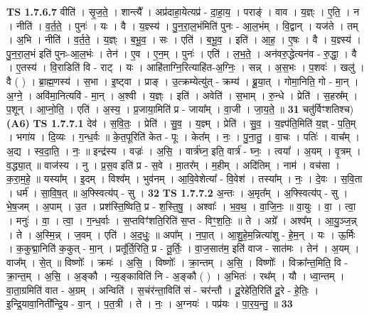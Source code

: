\documentclass[17pt]{extarticle}
\begin{document}
                  \newline
                                \textbf{ TS 1.7.6.7} \newline
                  वीति॑ । सृ॒ज॒ते॒ । शान्त्यै᳚ । अप्र॑दाहा॒येत्यप्र॑ - दा॒हा॒य॒ । पराङ्॑ । वाव । य॒ज्ञ्ः । ए॒ति॒ । न । नीति॑ । व॒र्त॒ते॒ । पुनः॑ । यः । वै । य॒ज्ञ्स्य॑ । पु॒न॒रा॒ल॒भंमिति॑ पुनः - आ॒ल॒भंम् । वि॒द्वान् । यज॑ते । तम् । अ॒भि । नीति॑ । व॒र्त॒ते॒ । य॒ज्ञ्ः । ब॒भू॒व॒ । सः । एति॑ । ब॒भू॒व॒ । इति॑ । आ॒ह॒ । ए॒षः । वै । य॒ज्ञ्स्य॑ । पु॒न॒रा॒ल॒भं इति॑ पुनः-आ॒ल॒भंः । तेन॑ । ए॒व । ए॒न॒म् । पुनः॑ । एति॑ । ल॒भ॒ते॒ । अन॑वरु॒द्धेत्यन॑व - रु॒द्धा॒ । वै । ए॒तस्य॑ । वि॒राडिति॑ वि - राट् । यः । आहि॑ताग्नि॒रित्याहि॑त-अ॒ग्निः॒ । सन्न् । अ॒स॒भः । प॒शवः॑ । खलु॑ । वै ( ) । ब्रा॒ह्म॒णस्य॑ । स॒भा । इ॒ष्ट्वा । प्राङ् । उ॒त्क्रम्येत्यु॑त् - क्रम्य॑ । ब्रू॒या॒त् । गोमा॒निति॒ गो - मा॒न् । अ॒ग्ने॒ । अवि॑मा॒नित्यवि॑ - मा॒न् । अ॒श्वी । य॒ज्ञ्ः । इति॑ । अवेति॑ । स॒भाम् । रु॒न्धे । प्रेति॑ । स॒हस्र᳚म् । प॒शून् । आ॒प्नो॒ति॒ । एति॑ । अ॒स्य॒ । प्र॒जाया॒मिति॑ प्र - जाया᳚म् । वा॒जी । जा॒य॒ते॒ ॥ \textbf{  31} \newline
                  \newline
                      चतु॑र्विꣳशतिश्च)  \textbf{(A6)} \newline \newline
                                \textbf{ TS 1.7.7.1} \newline
                  देव॑ । स॒वि॒तः॒ । प्रेति॑ । सु॒व॒ । य॒ज्ञ्म् । प्रेति॑ । सु॒व॒ । य॒ज्ञ्प॑ति॒मिति॑ य॒ज्ञ् - प॒ति॒म् । भगा॑य । दि॒व्यः । ग॒न्ध॒र्वः ॥ के॒त॒पूरिति॑ केत - पूः । केत᳚म् । नः॒ । पु॒ना॒तु॒ । वा॒चः । पतिः॑ । वाच᳚म् । अ॒द्य । स्व॒दा॒ति॒ । नः॒ ॥ इन्द्र॑स्य । वज्रः॑ । अ॒सि॒ । वार्त्र॑घ्न॒ इति॒ वार्त्र॑ - घ्नः॒ । त्वया᳚ । अ॒यम् । वृ॒त्रम् । व॒द्ध्या॒त् ॥ वाज॑स्य । नु । प्र॒स॒व इति॑ प्र - स॒वे । मा॒तर᳚म् । म॒हीम् । अदि॑तिम् । नाम॑ । वच॑सा । क॒रा॒म॒हे॒ ॥ यस्या᳚म् । इ॒दम् । विश्व᳚म् । भुव॑नम् । आ॒वि॒वेशेत्या᳚ - वि॒वेश॑ । तस्या᳚म् । नः॒ । दे॒वः । स॒वि॒ता । धर्म॑ । सा॒वि॒ष॒त् ॥ अ॒फ्स्वित्य॑प् - सु । \textbf{  32} \newline
                  \newline
                                \textbf{ TS 1.7.7.2} \newline
                  अ॒न्तः । अ॒मृत᳚म् । अ॒फ्स्वित्य॑प् - सु । भे॒ष॒जम् । अ॒पाम् । उ॒त । प्रश॑स्ति॒ष्विति॒ प्र - श॒स्ति॒षु॒ । अश्वाः᳚ । भ॒व॒थ॒ । वा॒जि॒नः॒ ॥ वा॒युः । वा॒ । त्वा॒ । मनुः॑ । वा॒ । त्वा॒ । ग॒न्ध॒र्वाः । स॒प्तविꣳ॑शति॒रिति॑ स॒प्त - विꣳ॒॒श॒तिः॒ ॥ ते । अग्रे᳚ । अश्व᳚म् । आ॒यु॒ञ्ज॒न्न् । ते । अ॒स्मि॒न्न् । ज॒वम् । एति॑ । अ॒द॒धुः॒ ॥ अपा᳚म् । न॒पा॒त् । आ॒शु॒हे॒म॒न्नित्या॑शु - हे॒म॒न् । यः । ऊ॒र्मिः । क॒कुद्मा॒निति॑ क॒कुत् - मा॒न् । प्रतू᳚र्ति॒रिति॒ प्र - तू॒र्तिः॒ । वा॒ज॒सात॑म॒ इति॑ वाज - सात॑मः । तेन॑ । अ॒यम् । वाज᳚म् । से॒त् ॥ विष्णोः᳚ । क्रमः॑ । अ॒सि॒ । विष्णोः᳚ । क्रा॒न्तम् । अ॒सि॒ । विष्णोः᳚ । विक्रा᳚न्त॒मिति॒ वि - क्रा॒न्त॒म् । अ॒सि॒ । अ॒ङ्कौ । न्य॒ङ्काविति॑ नि - अ॒ङ्कौ ( ) । अ॒भितः॑ । रथ᳚म् । यौ । ध्वा॒न्तम् । वा॒ता॒ग्रमिति॑ वात - अ॒ग्रम् । अन्विति॑ । स॒चंर॑न्ता॒विति॑ सं - चर॑न्तौ । दू॒रेहे॑ति॒रिति॑ दू॒रे - हे॒तिः॒ । इ॒न्द्रि॒यावा॒निती᳚न्द्रि॒य - वा॒न् । प॒त॒त्री । ते । नः॒ । अ॒ग्नयः॑ । पप्र॑यः । पा॒र॒य॒न्तु॒ ॥ \textbf{  33} \newline
\end{document}
